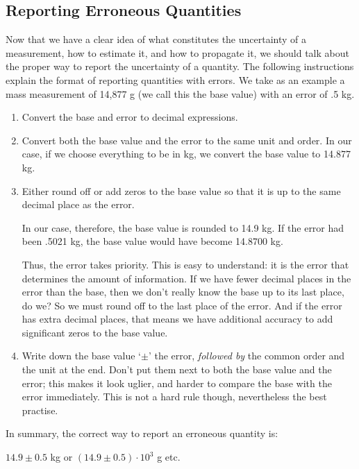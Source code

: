 \subsection{Reporting Erroneous Quantities} %
\label{sec:intro:reporting}
Now that we have a clear idea of  what constitutes  the uncertainty of a 
measurement, how to estimate it, and how to propagate it, we should talk about
the proper way to report the uncertainty of a quantity. The following instructions explain the format of reporting quantities with errors. We take as an example a mass measurement of 14,877 g (we call this the base value) with an error of .5 kg. 
\begin{enumerate}
\item Convert the base and error to decimal expressions.

\item Convert both the base value and the error to the same unit and order. In our case, if we choose everything to be in kg, we convert the base value to 14.877 kg.

\item Either round off or add zeros to the base value so that it is up to the same decimal place as the error.

In our case, therefore, the base value is rounded to 14.9 kg. If the error had been .5021 kg, the base value would have become 14.8700 kg.

Thus, the error takes priority. This is easy to understand: it is the error that determines the amount of information. If we have fewer decimal places in the error than the base, then we don't really know the base up to its last place, do we? So we must round off to the last place of the error. And if the error has extra decimal places, that means we have additional accuracy to add significant zeros to the base value.
\item Write down the base value `$\pm$'  the error, {\it followed by} the common order and the unit at the end. Don't put them next to both the base value and the error; this makes it look uglier, and harder to compare the base with the error immediately. This is not a hard rule though, nevertheless the best practise.
\end{enumerate}

In summary, the correct way to report an erroneous quantity is:

\begin{center}
$14.9 \pm 0.5$ kg or $(14.9 \pm 0.5) \cdot 10^3$ g etc.
\end{center}

